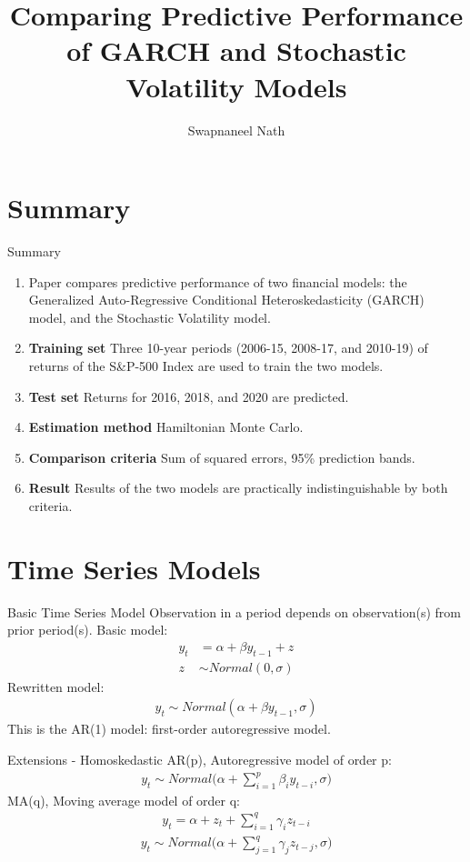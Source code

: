 \documentclass[11pt]{beamer}
\author{Swapnaneel Nath}
\title{Comparing Predictive Performance of GARCH and Stochastic Volatility Models}
\begin{document}
\begin{frame}
\titlepage
\end{frame}


\section{Summary}
\begin{frame}{Summary}
\begin{enumerate}
\item Paper compares predictive performance of two financial models: the Generalized Auto-Regressive Conditional Heteroskedasticity (GARCH) model, and the Stochastic Volatility model.
\item \textbf{Training set} Three 10-year periods (2006-15, 2008-17, and 2010-19) of returns of the S\&P-500 Index are used to train the two models.
\item \textbf{Test set} Returns for 2016, 2018, and 2020 are predicted.
\item \textbf{Estimation method} Hamiltonian Monte Carlo.
\item \textbf{Comparison criteria} Sum of squared errors, 95\% prediction bands.
\item \textbf{Result} Results of the two models are practically indistinguishable by both criteria.
\end{enumerate}

\end{frame}

\section{Time Series Models}
\begin{frame}{Basic Time Series Model}
Observation in a period depends on observation(s) from prior period(s).
Basic model:
\begin{align}
y_t &= \alpha + \beta y_{t-1} + z \\
z &\sim Normal(0, \sigma)
\end{align}
Rewritten model:
\begin{align}
y_t \sim Normal(\alpha + \beta y_{t-1}, \sigma)
\end{align}
This is the AR(1) model: first-order autoregressive model.

\end{frame}

\begin{frame}{Extensions - Homoskedastic}
AR(p), Autoregressive model of order p:
\begin{align}
y_t \sim Normal \big(\alpha + \sum_{i=1}^p \beta_i y_{t-i}, \sigma \big)
\end{align}
MA(q), Moving average model of order q:
\begin{align}
y_t = \alpha + z_t + \sum_{i=1}^q \gamma_i z_{t-i}
\end{align}
\begin{align}
y_t \sim Normal \big( \alpha + \sum_{j=1}^q \gamma_j z_{t-j}, \sigma \big)
\end{align}

\end{frame}
\end{document}
